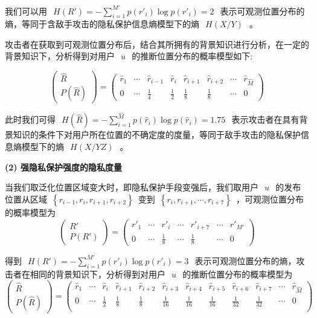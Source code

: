 我们可以用~$~H({R}')=-\sum_{i=1}^{{M}'}p({r}'_{i})\log p({r}'_{i})=2~$~表示可观测位置分布的熵，等同于含敌手攻击的隐私保护信息熵模型下的熵~$~H(X/Y)~$~。

攻击者在获取到可观测位置分布后，结合其所拥有的背景知识进行分析，在一定的背景知识下，分析得到对用户~$~u~$~的推断位置分布的概率模型如下:

\begin{equation}
\begin{pmatrix}
\hat{R}\\ 
P(\hat{R})
\end{pmatrix}=\begin{pmatrix}
\hat{r}_{1} & \cdots  & \hat{r}_{i-1} & \hat{r}_{i} & \hat{r}_{i+1}  & \hat{r}_{i+2} & \cdots & \hat{r}_{\hat{M}} \\ 
0 & \cdots & \frac{1}{4} & \frac{1}{2} & \frac{1}{8}  & \frac{1}{8} & \cdots & 0
\end{pmatrix}
\end{equation}

此时我们可得~$~H(\hat{R})=-\sum_{i=1}^{\hat{M}}p(\hat{r}_{i})\log p(\hat{r}_{i})=1.75
~$~表示攻击者在具有背景知识的条件下对用户所在位置的不确定度的度量，等同于敌手攻击的隐私保护信息熵模型下的熵~$~H(X/YZ)~$~。

\textbf{(2) 强隐私保护强度的隐私度量}

当我们取泛化位置区域变大时，即隐私保护手段变强后，我们取用户~$~u~$~的发布位置从区域~$\left \{ r_{i-1},r_{i},r_{i+1},r_{i+2} \right \}$~变到~$\left \{ r_{i},r_{i+1},\cdots,r_{i+7} \right \}$~，可观测位置分布的概率模型为
\begin{equation}
\begin{pmatrix}
{R}'\\ 
P({R}')
\end{pmatrix}=\begin{pmatrix}
{r}'_{1} & \cdots & {r}'_{i}  & \cdots & {r}'_{i+7} & \cdots & {r}'_{{M}'}\\ 
0 & \cdots  & \frac{1}{8} & \cdots  & \frac{1}{8} & \cdots  & 0
\end{pmatrix}
\end{equation}

得到~$~H({R}')=-\sum_{i=1}^{{M}'}p({r}'_{i})\log p({r}'_{i})=3~$~表示可观测位置分布的熵，攻击者在相同的背景知识下，分析得到对用户~$~u~$~的推断位置分布的概率模型为
\begin{equation}
\begin{pmatrix}
\hat{R}\\ 
P(\hat{R})
\end{pmatrix}=\left( \begin{array}{cccccccccccc} 
\hat{r}_{1} & \cdots  & \hat{r}_{i} & \hat{r}_{i+1} & \hat{r}_{i+2} & \hat{r}_{i+3} & \hat{r}_{i+4} & \hat{r}_{i+5} & \hat{r}_{i+6} & \hat{r}_{i+7} & \cdots  & \hat{r}_{\hat{M}} \\
0 & \cdots  & \frac{1}{2} & \frac{1}{8} & \frac{1}{8} & \frac{1}{16} & \frac{1}{16} & \frac{1}{16} & \frac{1}{32} & \frac{1}{32} & \cdots  & 0\\
\end{array} \right)
\end{equation}

